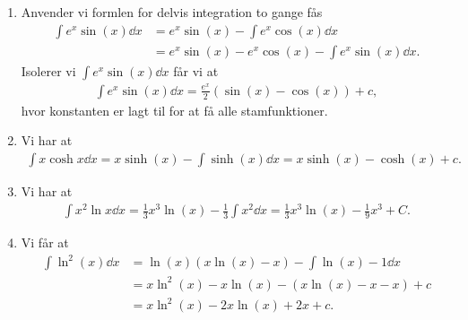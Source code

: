 \begin{enumerate}
	\item\label{it:int22ans} Anvender vi formlen for delvis integration to gange fås
	\begin{align*}
	\int e^{x}\sin(x) \dd x&=e^x\sin (x)-\int e^x\cos(x)\dd x\\&=e^x\sin(x)-e^x\cos(x)-\int e^x\sin(x)\dd x.
	\end{align*}
	Isolerer vi $ \int e^x\sin(x)\dd x $ får vi at
	\begin{align*}
	\int e^{x}\sin(x) \dd x=\frac{e^x}{2}(\sin(x)-\cos(x))+c,
	\end{align*}
	hvor konstanten er lagt til for at få alle stamfunktioner.
	
	\item Vi har at
	\begin{align*}
	\int x\cosh x \dd x=x\sinh(x)-\int \sinh(x)\dd x=x\sinh(x)-\cosh(x)+c.
	\end{align*}

	
	\item Vi har at
	\begin{align*}
	\int x^2\ln x\dd x=\frac{1}{3}x^3\ln(x)-\frac{1}{3}\int x^2\dd x=\frac{1}{3}x^3\ln(x)-\frac{1}{9}x^3+C.
	\end{align*}
	
	\item Vi får at
	\begin{align*}
	\int \ln^2(x)\dd x&=\ln(x)(x\ln(x)-x)-\int \ln(x)-1\dd x\\&=x\ln^2(x)-x\ln(x)-(x\ln(x)-x-x)+c\\&=x\ln^2(x)-2x\ln(x)+2x+c.
	\end{align*}
\end{enumerate}
